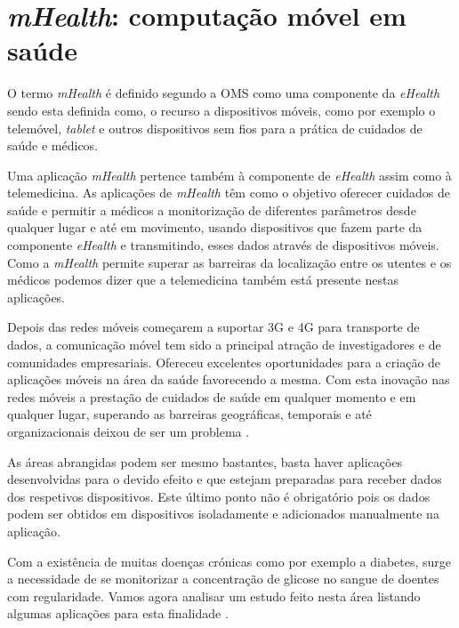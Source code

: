 \section{\textit{mHealth}: computação móvel em saúde}
O termo \textit{\gls{mHealth}} \'e definido segundo a OMS como uma componente da \textit{eHealth} \cite{mhealth_oms} sendo esta definida como, o recurso a dispositivos m\'oveis, como por exemplo o telem\'ovel, \textit{tablet} e outros dispositivos sem fios para a pr\'atica de cuidados de sa\'ude e m\'edicos.
\par
Uma aplica\c c\~ao \textit{mHealth} pertence tamb\'em \`a componente de \textit{eHealth} assim como \`a telemedicina. As aplica\c c\~oes de \textit{mHealth} t\^em como o objetivo oferecer cuidados de sa\'ude e permitir a m\'edicos a monitoriza\c c\~ao de diferentes par\^ametros desde qualquer lugar e at\'e em movimento, usando dispositivos que fazem parte da componente \textit{eHealth} e transmitindo, esses dados atrav\'es de dispositivos m\'oveis. Como a \textit{mHealth} permite superar as barreiras da localiza\c c\~ao entre os utentes e os m\'edicos podemos dizer que a telemedicina tamb\'em est\'a presente nestas aplica\c c\~oes.
\par
Depois das redes m\'oveis come\c carem a suportar 3G e 4G para transporte de dados, a comunica\c c\~ao m\'ovel tem sido a  principal atra\c c\~ao de investigadores e de comunidades empresariais. Ofereceu excelentes oportunidades para a cria\c c\~ao de  aplica\c c\~oes m\'oveis na \'area da sa\'ude favorecendo a mesma. Com esta inova\c c\~ao nas redes m\'oveis a presta\c c\~ao de cuidados de sa\'ude em qualquer momento e em qualquer lugar, superando as barreiras geogr\'aficas, temporais e at\'e organizacionais deixou de ser um problema \cite{mhealth}.
\par
As \'areas abrangidas podem ser mesmo bastantes, basta haver aplica\c c\~oes desenvolvidas para o devido efeito e que estejam preparadas para receber dados dos respetivos dispositivos. Este \'ultimo ponto não \'e obrigat\'orio pois os dados podem ser obtidos em dispositivos isoladamente e adicionados manualmente na aplica\c c\~ao. 
\par
Com a exist\^encia de muitas doen\c cas cr\'onicas como por exemplo a diabetes, surge a necessidade de se monitorizar a concentra\c c\~ao de glicose no sangue de doentes com regularidade. Vamos agora analisar um estudo feito nesta área listando algumas aplica\c c\~oes para esta finalidade \cite{mhealth}.

